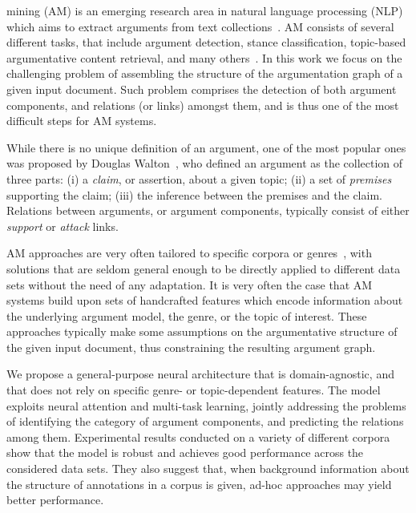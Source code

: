\documentclass[journal]{IEEEtran}
\begin{document}
 mining (AM) is an emerging research area in natural language processing (NLP) which aims to extract arguments from text collections~\cite{TOIT2016}. AM consists of several different tasks, that include argument detection, stance classification, topic-based argumentative content retrieval, and many others~\cite{argminingsurvey2020}. In this work we focus on the challenging problem of assembling the structure of the argumentation graph of a given input document. Such problem comprises the detection of both argument components, and relations (or links) amongst them, and is thus one of the most difficult steps for AM systems.

While there is no unique definition of an argument, one of the most popular ones was proposed by Douglas Walton~\cite{WaltonArgAIBook}, who defined an argument as the collection of three parts: (i) a \textit{claim}, or assertion, about a given topic; (ii) a set of \textit{premises} supporting the claim; (iii) the inference between the premises and the claim. Relations between arguments, or argument components, typically consist of either \textit{support} or \textit{attack} links.

AM approaches are very often tailored to specific corpora or genres~\cite{stab2017parsing,persing2016end,Slonim2014}, with solutions that are seldom general enough to be directly applied to different data sets without the need of any adaptation. It is very often the case that AM systems build upon sets of handcrafted features which encode information about the underlying argument model, the genre, or the topic of interest. These approaches typically make some assumptions on the argumentative structure of the given input document, thus constraining the resulting argument graph.

We propose a general-purpose neural architecture that is domain-agnostic, and that does not rely on specific genre- or topic-dependent features. The model exploits neural attention and multi-task learning, jointly addressing the problems of identifying the category of argument components, and  predicting the relations among them. Experimental results conducted on a variety of different corpora show that the model is robust and achieves good performance across the considered data sets. They also suggest that, when background information about the structure of annotations in a corpus is given, ad-hoc approaches may yield better performance.
\end{document}
